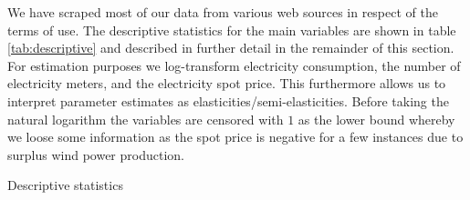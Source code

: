 \label{sec:data}
We have scraped most of our data from various web sources in respect of the terms of use. The descriptive statistics for the main variables are shown in table \ref{tab:descriptive} and described in further detail in the remainder of this section.
\medskip\\
For estimation purposes we log-transform electricity consumption, the number of electricity meters, and the electricity spot price. This furthermore allows us to interpret parameter estimates as elasticities/semi-elasticities. Before taking the natural logarithm the variables are censored with $1$ as the lower bound whereby we loose some information as the spot price is negative for a few instances due to surplus wind power production.
\begin{table}[H]
  \centering
  \caption{Descriptive statistics}
  \label{tab:descriptive}
  \footnotesize
    
\end{table}

